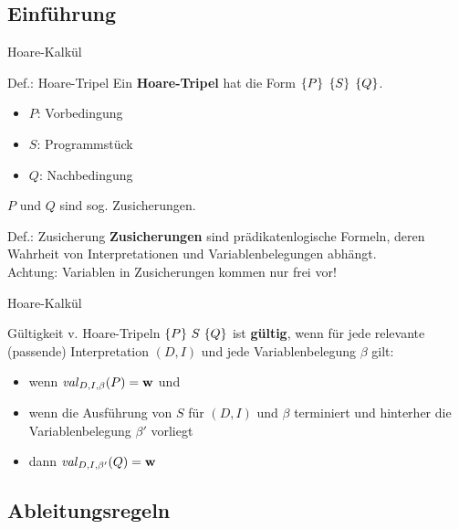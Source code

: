 \subsection{Einführung}
\begin{frame}{Hoare-Kalkül}
	\begin{block}{Def.: Hoare-Tripel}
		Ein \textbf{Hoare-Tripel} hat die Form \textcolor{kit-red100}{$\left\{ P \right\}$} {$\left\{ S \right\}$} \textcolor{kit-red100}{$\left\{ Q \right\}$}.
		\begin{itemize}
			\item \textcolor{kit-red100}{$P$}: Vorbedingung
			\item $S$: Programmstück
			\item \textcolor{kit-red100}{$Q$}: Nachbedingung
		\end{itemize}
		$P$ und $Q$ sind sog. Zusicherungen.
	\end{block}

	\begin{block}{Def.: Zusicherung}
		\textbf{Zusicherungen} sind prädikatenlogische Formeln, deren Wahrheit von Interpretationen und Variablenbelegungen abhängt.\\
		Achtung: Variablen in Zusicherungen kommen nur frei vor!
	\end{block}
\end{frame}

\begin{frame}{Hoare-Kalkül}
	\begin{block}{Gültigkeit v. Hoare-Tripeln}
		$\left\{ P \right\} \, S \, \left\{ Q \right\}$ ist \textbf{gültig}, wenn für jede relevante (passende) Interpretation $(D,I)$ und jede Variablenbelegung $\beta$ gilt:
		\begin{itemize}
			\item wenn $\hbox{\textit{val}}_{D,I,\beta}(P) = \mathbf{w}$ und
			\item wenn die Ausführung von $S$ für $(D,I)$ und $\beta$ terminiert und hinterher die Variablenbelegung $\beta'$ vorliegt
			\item dann $\hbox{\textit{val}}_{D,I,\beta'}(Q) = \mathbf{w}$
		\end{itemize}
	\end{block}
\end{frame}




\subsection{Ableitungsregeln}


